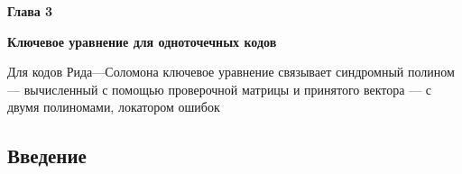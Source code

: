\documentclass[12pt]{article}
\theoremstyle{definition}
\begin{document}
\begin{center}
{\Large\bfseries Глава 3}
\end{center}

\begin{center}
{\Large\bfseries Ключевое уравнение для одноточечных кодов}
\end{center}

Для кодов Рида—Соломона ключевое уравнение связывает синдромный полином —
вычисленный с помощью проверочной матрицы и принятого вектора — с двумя
полиномами, локатором ошибок

\subsection{Введение}
\end{document}
